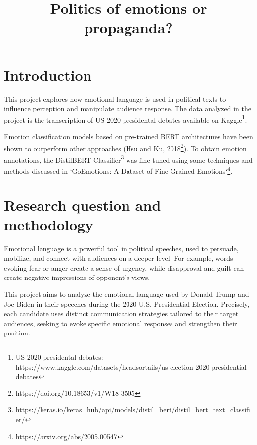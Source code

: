 \documentclass[pdflatex,sn-mathphys-num]{sn-jnl}%
\begin{document}
\title[Article Title]{Politics of emotions or propaganda?}

\author{ }



\maketitle

\section{Introduction}\label{sec1}

This project explores how emotional language is used in political texts to influence perception and manipulate audience response. The data analyzed in the project is the transcription of US 2020 presidental debates available on Kaggle\footnote{US 2020 presidental debates: \\ https://www.kaggle.com/datasets/headsortails/us-election-2020-presidential-debates}. 

Emotion classification models based on pre-trained BERT architectures have been shown to outperform other approaches (Hsu and Ku, 2018\footnote{https://doi.org/10.18653/v1/W18-3505}). To obtain emotion annotations, the DistilBERT Classifier\footnote{https://keras.io/keras_hub/api/models/distil_bert/distil_bert_text_classifier/} was fine-tuned using some techniques and methods discussed in `GoEmotions: A Dataset of Fine-Grained Emotions`\footnote{https://arxiv.org/abs/2005.00547}. 


\section{Research question and methodology}\label{sec2}

Emotional language is a powerful tool in political speeches, used to persuade, mobilize, and connect with audiences on a deeper level. For example, words evoking fear or anger create a sense of urgency, while disapproval and guilt can create negative impressions of opponent's views.

This project aims to analyze the emotional language used by Donald Trump and Joe Biden in their speeches during the 2020 U.S. Presidential Election. Precisely, each candidate uses distinct communication strategies tailored to their target audiences, seeking to evoke specific emotional responses and strengthen their position.
\end{document}
